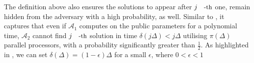 

The  definition above also ensures  the  solutions to appear after $j\text{\small{-th}}$ one,  remain hidden from the adversary with a high probability, as well. Similar to \cite{BonehBBF18,MalavoltaT19,garay2019}, it captures that even if     $\mathcal{A}_{\scriptscriptstyle 1}$ computes on the public parameters for a polynomial time,  $\mathcal{A}_{\scriptscriptstyle 2}$  cannot find $j\text{\small{-th}}$  solution in time $\delta(j\Delta)<j\Delta$ utilising $\pi(\Delta)$ parallel processors, with a probability significantly greater than $\frac{1}{2}$. As highlighted in  \cite{BonehBBF18}, we can set $\delta(\Delta)=(1-\epsilon)\Delta$ for a small  $\epsilon$, where $0<\epsilon<1$
